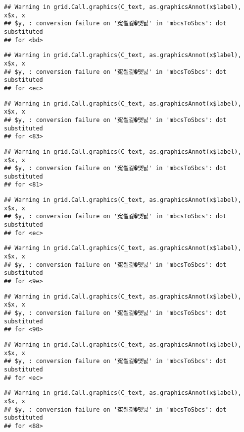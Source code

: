 \documentclass[]{article}
\begin{document}
\begin{verbatim}
## Warning in grid.Call.graphics(C_text, as.graphicsAnnot(x$label), x$x, x
## $y, : conversion failure on '寃쎌긽�먯닔' in 'mbcsToSbcs': dot substituted
## for <bd>
\end{verbatim}

\begin{verbatim}
## Warning in grid.Call.graphics(C_text, as.graphicsAnnot(x$label), x$x, x
## $y, : conversion failure on '寃쎌긽�먯닔' in 'mbcsToSbcs': dot substituted
## for <ec>
\end{verbatim}

\begin{verbatim}
## Warning in grid.Call.graphics(C_text, as.graphicsAnnot(x$label), x$x, x
## $y, : conversion failure on '寃쎌긽�먯닔' in 'mbcsToSbcs': dot substituted
## for <83>
\end{verbatim}

\begin{verbatim}
## Warning in grid.Call.graphics(C_text, as.graphicsAnnot(x$label), x$x, x
## $y, : conversion failure on '寃쎌긽�먯닔' in 'mbcsToSbcs': dot substituted
## for <81>
\end{verbatim}

\begin{verbatim}
## Warning in grid.Call.graphics(C_text, as.graphicsAnnot(x$label), x$x, x
## $y, : conversion failure on '寃쎌긽�먯닔' in 'mbcsToSbcs': dot substituted
## for <ec>
\end{verbatim}

\begin{verbatim}
## Warning in grid.Call.graphics(C_text, as.graphicsAnnot(x$label), x$x, x
## $y, : conversion failure on '寃쎌긽�먯닔' in 'mbcsToSbcs': dot substituted
## for <9e>
\end{verbatim}

\begin{verbatim}
## Warning in grid.Call.graphics(C_text, as.graphicsAnnot(x$label), x$x, x
## $y, : conversion failure on '寃쎌긽�먯닔' in 'mbcsToSbcs': dot substituted
## for <90>
\end{verbatim}

\begin{verbatim}
## Warning in grid.Call.graphics(C_text, as.graphicsAnnot(x$label), x$x, x
## $y, : conversion failure on '寃쎌긽�먯닔' in 'mbcsToSbcs': dot substituted
## for <ec>
\end{verbatim}

\begin{verbatim}
## Warning in grid.Call.graphics(C_text, as.graphicsAnnot(x$label), x$x, x
## $y, : conversion failure on '寃쎌긽�먯닔' in 'mbcsToSbcs': dot substituted
## for <88>
\end{verbatim}
\end{document}
